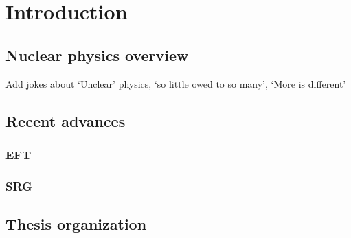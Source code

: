 \cleardoublepage
\chapter{Introduction}

	\section{Nuclear physics overview}
     	
     	Add jokes about `Unclear' physics, `so little owed to so many', 
     	`More is different'

	\section{Recent advances}

	\subsection{EFT}

	\subsection{SRG}

	\section{Thesis organization}